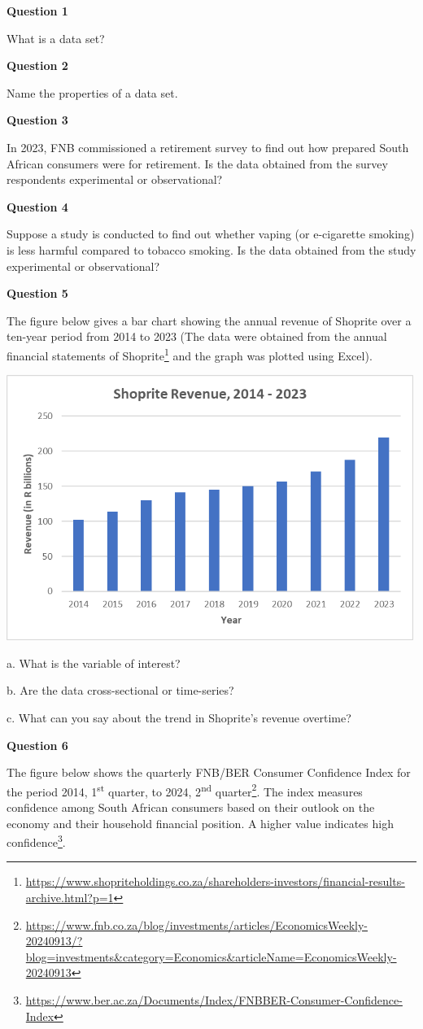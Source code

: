 \documentclass[
]{book}
\begin{document}
\textbf{Question 1}

What is a data set?

\textbf{Question 2}

Name the properties of a data set.

\textbf{Question 3}

In 2023, FNB commissioned a retirement survey to find out how prepared South African consumers were for retirement. Is the data obtained from the survey respondents experimental or observational?

\textbf{Question 4}

Suppose a study is conducted to find out whether vaping (or e-cigarette smoking) is less harmful compared to tobacco smoking. Is the data obtained from the study experimental or observational?

\textbf{Question 5}

The figure below gives a bar chart showing the annual revenue of Shoprite over a ten-year period from 2014 to 2023 (The data were obtained from the annual financial statements of Shoprite\footnote{\url{https://www.shopriteholdings.co.za/shareholders-investors/financial-results-archive.html?p=1}} and the graph was plotted using Excel).

\includegraphics[width=5.20833in,height=\textheight]{images/clipboard-3088691256.png}

a. What is the variable of interest?

b. Are the data cross-sectional or time-series?

c. What can you say about the trend in Shoprite's revenue overtime?

\textbf{Question 6}

The figure below shows the quarterly FNB/BER Consumer Confidence Index for the period 2014, 1\textsuperscript{st} quarter, to 2024, 2\textsuperscript{nd} quarter\footnote{\url{https://www.fnb.co.za/blog/investments/articles/EconomicsWeekly-20240913/?blog=investments&category=Economics&articleName=EconomicsWeekly-20240913}}. The index measures confidence among South African consumers based on their outlook on the economy and their household financial position. A higher value indicates high confidence\footnote{\url{https://www.ber.ac.za/Documents/Index/FNBBER-Consumer-Confidence-Index}}.
\end{document}
